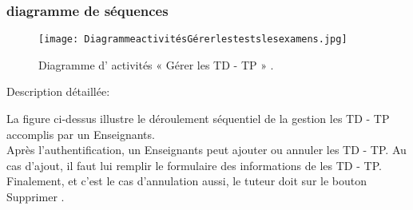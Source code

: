 \subsubsection{diagramme de séquences }
\begin{figure}[ht]
	\centering
	\texttt{[image: DiagrammeactivitésGérerlestestslesexamens.jpg]}
	\caption{Diagramme d' activités « Gérer les  TD  -  TP » .}
	\label{fig:Diagramme d' activités  Gérer les  TD  -  TP }
\end{figure}
\FloatBarrier
{\Large \color{cyan} Description détaillée:}

La figure ci-dessus illustre le déroulement séquentiel de la gestion les  TD  -  TP accomplis par un
Enseignants.\\
Après l’authentification, un Enseignants peut ajouter ou annuler les  TD  -  TP. Au cas d’ajout, il faut lui
 remplir le formulaire  des informations de les  TD  -  TP.\\
Finalement, et c’est le cas d’annulation aussi, le tuteur doit sur le bouton Supprimer .
\clearpage


